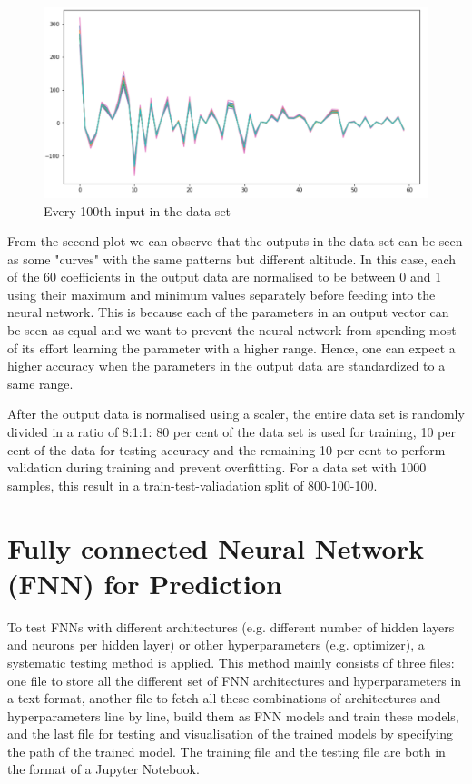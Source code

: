 \begin{figure}[H]
    \caption{Every 100th input in the data set}
    \includegraphics[scale=0.6]{figures/geoid_images/Geoid_sample_output.png}
\end{figure}

From the second plot we can observe that the outputs in the data set can be seen as some "curves" with the same patterns but different altitude. In this case, each of the 60 coefficients in the output data are normalised to be between 0 and 1 using their maximum and minimum values separately before feeding into the neural network. This is because each of the parameters in an output vector can be seen as equal and we want to prevent the neural network from spending most of its effort learning the parameter with a higher range. Hence, one can expect a higher accuracy when the parameters in the output data are standardized to a same range.

After the output data is normalised using a scaler, the entire data set is randomly divided in a ratio of 8:1:1: 80 per cent of the data set is used for training, 10 per cent of the data for testing accuracy and the remaining 10 per cent to perform validation during training and prevent overfitting. For a data set with 1000 samples, this result in a train-test-valiadation split of 800-100-100.


\section{Fully connected Neural Network (FNN) for Prediction}

To test FNNs with different architectures (e.g. different number of hidden layers and neurons per hidden layer) or other hyperparameters (e.g. optimizer), a systematic testing method is applied. This method mainly consists of three files: one file to store all the different set of FNN architectures and hyperparameters in a text format, another file to fetch all these combinations of architectures and hyperparameters line by line, build them as FNN models and train these models, and the last file for testing and visualisation of the trained models by specifying the path of the trained model. The training file and the testing file are both in the format of a Jupyter Notebook.

